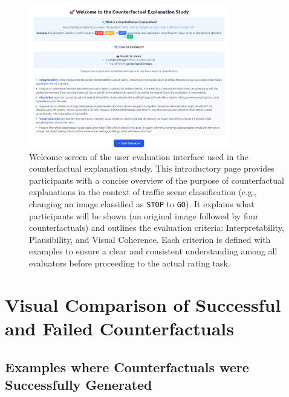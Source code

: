 \begin{figure}
    \centering
    \includegraphics[width=0.78\textwidth]{img/web_app_screenshots/form_ui_info.png}
    \caption{Welcome screen of the user evaluation interface used in the counterfactual explanation study. This introductory page provides participants with a concise overview of the purpose of counterfactual explanations in the context of traffic scene classification (e.g., changing an image classified as \texttt{STOP} to \texttt{GO}). It explains what participants will be shown (an original image followed by four counterfactuals) and outlines the evaluation criteria: Interpretability, Plausibility, and Visual Coherence. Each criterion is defined with examples to ensure a clear and consistent understanding among all evaluators before proceeding to the actual rating task.}
    \label{fig:app:form_ui}
\end{figure}




\clearpage
\section*{Visual Comparison of Successful and Failed Counterfactuals} \label{app:visual_comparasions_of_CE}


\subsection{Examples where Counterfactuals were Successfully Generated}


